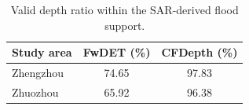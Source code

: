 \begin{table}[!t]
  \centering
  \caption{Valid depth ratio within the SAR-derived flood support.}
  \label{tab:valid_depth_ratio}
  \scriptsize
  \setlength{\tabcolsep}{8pt}
  \begin{tabular}{lcc}
    \toprule
    Study area & FwDET (\%) & CFDepth (\%) \\
    \midrule
    Zhengzhou & 74.65 & 97.83 \\
    Zhuozhou & 65.92 & 96.38 \\
    \bottomrule
  \end{tabular}
\end{table}
